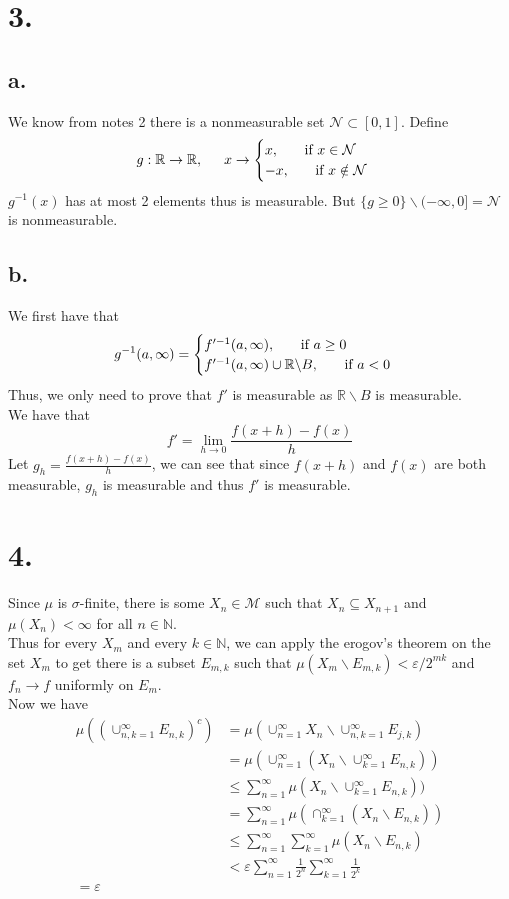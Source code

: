 \documentclass[11pt]{article}
\theoremstyle{mystyle}
\theoremstyle{definition}
\begin{document}
\section*{3.}
\subsection*{a.}
We know from notes 2 there is a nonmeasurable set $\mathcal{N} \subset [0,1]$. Define 
\[
  g: \mathbb{R} \to \mathbb{R}, \indent x \to
  \begin{cases}
    x, \indent \text{ if } x \in \mathcal{N} \\
    -x, \indent \text{ if } x \notin \mathcal{N}
  \end{cases}
\]
$g^{-1}(x)$ has at most 2 elements thus is measurable. But $\{g \ge 0\} \backslash (-\infty, 0] = \mathcal{N}$ is nonmeasurable.   
\subsection*{b.}
We first have that 
\[
  g^{-1}(a,\infty) = 
  \begin{cases}
    f'^{-1}(a,\infty), \indent \text{ if } a \ge 0 \\ 
    f'^{-1}(a,\infty) \cup \mathbb{R} \backslash B , \indent \text{ if } a < 0 \\
  \end{cases}
\]
Thus, we only need to prove that $f'$ is measurable as $\mathbb{R} \backslash B$ is measurable.\\
We have that 
\[
  f' = \lim_{h \to 0} \displaystyle\frac{f(x+h) - f(x)}{h}
\]
Let $g_h = \displaystyle\frac{f(x+h) - f(x)}{h}$, we can see that since $f(x+h)$ and $f(x)$ are both measurable, $g_h$ is measurable and thus $f'$ is measurable.
\newpage
\section*{4.}
Since $\mu$ is $\sigma$-finite, there is some $X_n \in \mathcal{M}$ such that $X_n \subseteq X_{n+1}$ and $\mu(X_n) < \infty$ for all $n \in \mathbb{N}$. \\ 
Thus for every $X_m$ and every $k \in \mathbb{N}$, we can apply the erogov's theorem on the set $X_m$ to get there is a subset $E_{m,k}$ such that $\mu(X_m \backslash E_{m,k}) < \varepsilon / 2^{mk} $ and $f_n \to f$ uniformly on $E_m$.\\
Now we have 
\begin{align*}
  \mu((\cup_{n,k=1}^\infty E_{n,k})^c) &= \mu(\cup_{n=1}^\infty X_n \backslash \cup_{n,k=1}^\infty E_{j,k}) \\
  &= \mu( \cup_{n=1}^\infty (X_n \backslash \cup_{k=1}^\infty E_{n,k})) \\
  &\le \sum_{n=1}^\infty \mu(X_n \backslash \cup_{k=1}^\infty E_{n,k})) \\
  &= \sum_{n=1}^\infty \mu (\cap_{k=1}^\infty (X_n \backslash E_{n,k})) \\ 
  &\le \sum_{n=1}^\infty \sum_{k=1}^\infty \mu(X_n \backslash E_{n,k}) \\
  &< \varepsilon \sum_{n=1}^\infty \displaystyle\frac{1}{2^n} \sum_{k=1}^\infty \displaystyle\frac{1}{2^k} \\
  = \varepsilon
\end{align*}
\newpage
\end{document}
